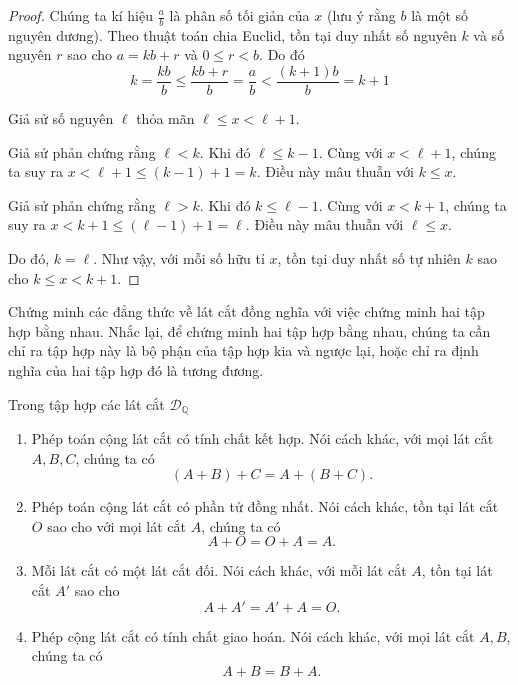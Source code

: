 \begin{proof}
    Chúng ta kí hiệu $\frac{a}{b}$ là phân số tối giản của $x$ (lưu ý rằng $b$ là một số nguyên dương). Theo thuật toán chia Euclid, tồn tại duy nhất số nguyên $k$ và số nguyên $r$ sao cho $a = kb + r$ và $0\leq r < b$. Do đó
    \[
        k = \frac{kb}{b} \leq \frac{kb + r}{b} = \frac{a}{b} < \frac{(k+1)b}{b} = k+1
    \]

    Giả sử số nguyên $\ell$ thỏa mãn $\ell\leq x < \ell + 1$.

    Giả sử phản chứng rằng $\ell < k$. Khi đó $\ell\leq k - 1$. Cùng với $x < \ell + 1$, chúng ta suy ra $x < \ell + 1\leq (k-1) + 1 = k$. Điều này mâu thuẫn với $k\leq x$.

    Giả sử phản chứng rằng $\ell > k$. Khi đó $k\leq \ell - 1$. Cùng với $x < k + 1$, chúng ta suy ra $x < k + 1\leq (\ell - 1) + 1 = \ell$. Điều này mâu thuẫn với $\ell\leq x$.

    Do đó, $k = \ell$. Như vậy, với mỗi số hữu tỉ $x$, tồn tại duy nhất số tự nhiên $k$ sao cho $k\leq x < k+1$.
\end{proof}

Chứng minh các đẳng thức về lát cắt đồng nghĩa với việc chứng minh hai tập hợp bằng nhau. Nhắc lại, để chứng minh hai tập hợp bằng nhau, chúng ta cần chỉ ra tập hợp này là bộ phận của tập hợp kia và ngược lại, hoặc chỉ ra định nghĩa của hai tập hợp đó là tương đương.

\begin{theorem}\label{theorem:properties-of-dedekind-cuts-addition}
    Trong tập hợp các lát cắt $\mathscr{D}_{\mathbb{Q}}$
    \begin{enumerate}[label={(\roman*)}]
        \item Phép toán cộng lát cắt có tính chất kết hợp. Nói cách khác, với mọi lát cắt $A, B, C$, chúng ta có
              \[
                  (A + B) + C = A + (B + C).
              \]
        \item Phép toán cộng lát cắt có phần tử đồng nhất. Nói cách khác, tồn tại lát cắt $O$ sao cho với mọi lát cắt $A$, chúng ta có
              \[
                  A + O = O + A = A.
              \]
        \item Mỗi lát cắt có một lát cắt đối. Nói cách khác, với mỗi lát cắt $A$, tồn tại lát cắt $A'$ sao cho
              \[
                  A + A' = A' + A = O.
              \]
        \item Phép cộng lát cắt có tính chất giao hoán. Nói cách khác, với mọi lát cắt $A, B$, chúng ta có
              \[
                  A + B = B + A.
              \]
    \end{enumerate}
\end{theorem}

